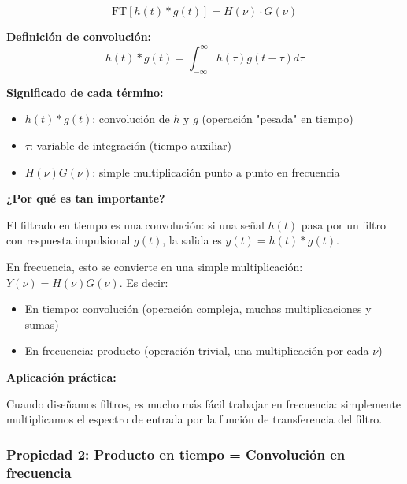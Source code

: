 \documentclass[11pt,a4paper]{article}
\begin{document}
\begin{tcolorbox}[colback=rojoclaro!20,colframe=azuloscuro,title=\textbf{Convolución $\leftrightarrow$ Producto}]
$$\boxed{\text{FT}[h(t) * g(t)] = H(\nu) \cdot G(\nu)}$$

\textbf{Definición de convolución:}
$$h(t) * g(t) = \int_{-\infty}^{\infty} h(\tau)g(t-\tau)d\tau$$

\textbf{Significado de cada término:}
\begin{itemize}
\item $h(t) * g(t)$: convolución de $h$ y $g$ (operación "pesada" en tiempo)
\item $\tau$: variable de integración (tiempo auxiliar)
\item $H(\nu)G(\nu)$: simple multiplicación punto a punto en frecuencia
\end{itemize}

\textbf{¿Por qué es tan importante?}

El filtrado en tiempo es una convolución: si una señal $h(t)$ pasa por un filtro con respuesta impulsional $g(t)$, la salida es $y(t) = h(t) * g(t)$.

En frecuencia, esto se convierte en una simple multiplicación: $Y(\nu) = H(\nu)G(\nu)$. Es decir:
\begin{itemize}
\item En tiempo: convolución (operación compleja, muchas multiplicaciones y sumas)
\item En frecuencia: producto (operación trivial, una multiplicación por cada $\nu$)
\end{itemize}

\textbf{Aplicación práctica:}

Cuando diseñamos filtros, es mucho más fácil trabajar en frecuencia: simplemente multiplicamos el espectro de entrada por la función de transferencia del filtro.
\end{tcolorbox}

\subsubsection{Propiedad 2: Producto en tiempo = Convolución en frecuencia}
\end{document}
